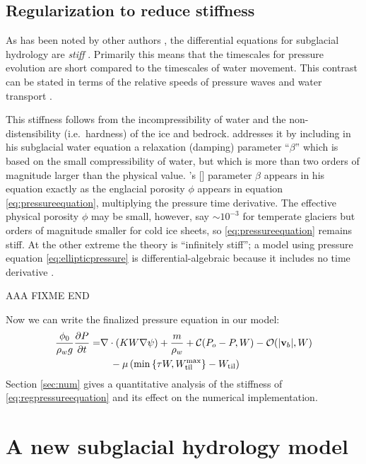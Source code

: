 \documentclass[11pt,final]{amsart}
\newcommand\bv{\mathbf{v}}
\newcommand{\Div}{\nabla\cdot}
\newcommand{\grad}{\nabla}
\newcommand{\Wtil}{W_{\text{til}}}
\newcommand{\Wtilmax}{W_{\text{til}}^{\text{max}}}
\newcommand{\citeapos}[1]{\citeauthor{#1}'s [\citeyear{#1}]}
\begin{document}
\subsection*{Regularization to reduce stiffness}  As has been noted by other authors \citep{Clarke2003,Schoofetal2012}, the differential equations for subglacial hydrology are \emph{stiff} \citep{AscherPetzold}.  Primarily  this means that the timescales for pressure evolution are short compared to the timescales of water movement.  This contrast can be stated in terms of the relative speeds of pressure waves and water transport \citep[Appendix A]{Clarke2003}.

This stiffness follows from the incompressibility of water and the non-distensibility (i.e.~hardness) of the ice and bedrock.  \cite{Clarke2003} addresses it by including in his subglacial water equation a relaxation (damping) parameter  ``$\beta$'' which is based on the small compressibility of water, but which is more than two orders of magnitude larger than the physical value.  \citeapos{Clarke2003} parameter $\beta$ appears in his equation exactly as the englacial porosity $\phi$ appears in equation \eqref{eq:pressureequation}, multiplying the pressure time derivative.  The effective physical porosity $\phi$ may be small, however, say $\sim 10^{-3}$ for temperate glaciers but orders of magnitude smaller for cold ice sheets, so \eqref{eq:pressureequation} remains stiff.  At the other extreme the \cite{Schoofetal2012} theory is ``infinitely stiff''; a model using pressure equation \eqref{eq:ellipticpressure} is differential-algebraic because it includes no time derivative \citep{AscherPetzold}.

AAA FIXME END

Now we can write the finalized pressure equation in our model:
\begin{align}
\frac{\phi_0}{\rho_w g} \frac{\partial P}{\partial t} = &\Div \left(K W \grad \psi \right) + \frac{m}{\rho_w} + \mathcal{C}(P_o-P,W) - \mathcal{O}(|\bv_b|,W) \label{eq:regpressureequation} \\
  &\quad - \mu \left(\min\left\{\tau W,\Wtilmax\right\} - \Wtil\right) \notag
\end{align}
Section \ref{sec:num} gives a quantitative analysis of the stiffness of \eqref{eq:regpressureequation} and its effect on the numerical implementation.


\section{A new subglacial hydrology model} \label{sec:newmodel}
\end{document}
